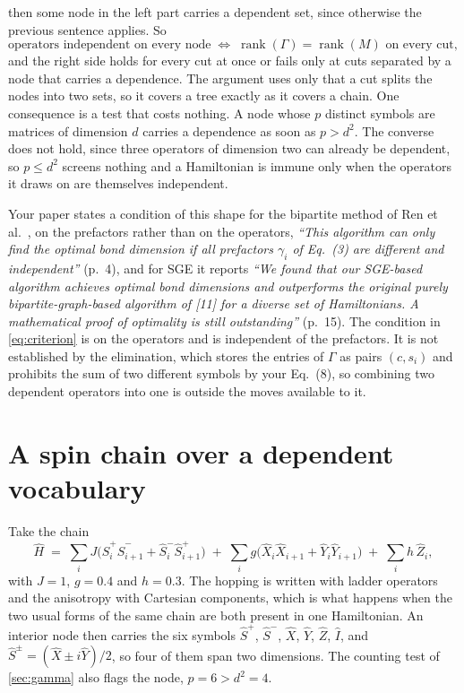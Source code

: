 \documentclass[11pt,a4paper]{article}
\newcommand{\rank}{\operatorname{rank}}
\begin{document}
then some node in the left part carries a dependent set, since otherwise the previous sentence
applies. So
%
\begin{equation}\label{eq:criterion}
  \text{operators independent on every node}
  \;\Longleftrightarrow\;
  \rank(\Gamma) = \rank(M) \text{ on every cut},
\end{equation}
%
and the right side holds for every cut at once or fails only at cuts separated by a node that
carries a dependence. The argument uses only that a cut splits the nodes into two sets, so it covers
a tree exactly as it covers a chain. One consequence is a test that costs nothing. A node whose $p$
distinct symbols are matrices of dimension $d$ carries a dependence as soon as $p > d^2$. The
converse does not hold, since three operators of dimension two can already be dependent, so $p \le
d^2$ screens nothing and a Hamiltonian is immune only when the operators it draws on are themselves
independent.

Your paper states a condition of this shape for the bipartite method of Ren et al.\ \cite{Ren2020},
on the prefactors rather than on
the operators, \emph{``This algorithm can only find the optimal bond dimension if all prefactors
$\gamma_i$ of Eq.~(3) are different and independent''} (p.~4), and for SGE it reports
\emph{``We found that our SGE-based algorithm achieves optimal bond dimensions and outperforms the
original purely bipartite-graph-based algorithm of [11] for a diverse set of Hamiltonians. A
mathematical proof of optimality is still outstanding''} (p.~15). The condition in
\cref{eq:criterion} is on the operators and is independent of the prefactors. It is not established
by the elimination, which stores the entries of $\Gamma$ as pairs $(c, s_i)$ and prohibits the sum of
two different symbols by your Eq.~(8), so combining two dependent operators into one is outside the moves
available to it.

\section{A spin chain over a dependent vocabulary}\label{sec:chain}

Take the chain
%
\begin{equation}\label{eq:xy}
  \hat{H} \;=\; \sum_{i} J \bigl( \hat{S}^{+}_i \hat{S}^{-}_{i+1}
                                + \hat{S}^{-}_i \hat{S}^{+}_{i+1} \bigr)
            \;+\; \sum_{i} g \bigl( \hat{X}_i \hat{X}_{i+1} + \hat{Y}_i \hat{Y}_{i+1} \bigr)
            \;+\; \sum_{i} h\, \hat{Z}_i ,
\end{equation}
%
with $J = 1$, $g = 0.4$ and $h = 0.3$. The hopping is written with ladder operators and the
anisotropy with Cartesian components, which is what happens when the two usual forms of the same
chain are both present in one Hamiltonian. An interior node then carries the six symbols
$\hat{S}^{+}$, $\hat{S}^{-}$, $\hat{X}$, $\hat{Y}$, $\hat{Z}$, $\hat{I}$, and
$\hat{S}^{\pm} = (\hat{X} \pm i\hat{Y})/2$, so four of them span two dimensions. The counting test
of \cref{sec:gamma} also flags the node, $p = 6 > d^2 = 4$.
\end{document}
